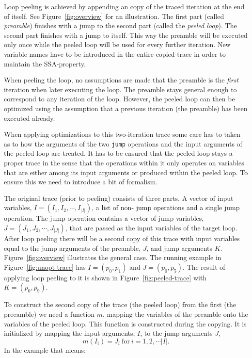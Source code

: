 \documentclass[preprint]{sigplanconf}
\begin{document}
Loop peeling is achieved by appending an copy of the traced iteration at
the end of itself. See Figure~\ref{fig:overview} for an illustration.
The first part (called \emph{preamble}) finishes with a jump to the second part
(called the \emph{peeled loop}). The second part finishes with a jump to itself. This way
the preamble will be executed only once while the peeled loop will
be used for every further iteration. New variable names have to be
introduced in the entire copied trace in order to maintain the SSA-property.

When peeling the loop, no assumptions are made that the preamble is
the \emph{first} iteration when later executing the loop. The preamble stays
general enough to correspond to any iteration of the loop.
However, the peeled loop can then be optimized using the assumption that a
previous iteration (the preamble) has been executed already.


When applying optimizations to this two-iteration trace
some care has to taken as to how the arguments of the two
\lstinline{jump} operations and the input arguments of the peeled loop are
treated. It has to be ensured that the peeled loop stays a proper
trace in the sense that the operations within it only operates on
variables that are either among its input arguments 
or produced within the peeled loop. To ensure this we need
to introduce a bit of formalism.

The original trace (prior to peeling) consists of three parts.
A vector of input
variables, $I=\left(I_1, I_2, \cdots, I_{|I|}\right)$, a list of non-
jump operations and a single
jump operation. The jump operation contains a vector of jump variables,
$J=\left(J_1, J_2, \cdots, J_{|J|}\right)$, that are passed as the input variables of the target loop. After
loop peeling there will be a second copy of this trace with input
variables equal to the jump arguments of the preamble, $J$, and jump
arguments $K$. 
Figure~\ref{fig:overview} illustrates the general case. The running
example in Figure~\ref{fig:unopt-trace} has  $I = \left( p_0, p_1
\right)$ and $J = \left( p_0, p_5 \right)$. The result of applying
loop peeling to it is shown in Figure~\ref{fig:peeled-trace} with 
$K = \left( p_0, p_9 \right)$. 

To construct the second copy of the trace (the peeled loop) from the
first (the preeamble) we need a
function $m$, mapping the variables of the preamble onto the
variables of the peeled loop. This function is constructed during the
copying. It is initialized by mapping the input arguments, $I$, to
the jump arguments $J$,
\begin{equation}
  m\left(I_i\right) = J_i \ \text{for}\ i = 1, 2, \cdots |I| .
\end{equation}
In the example that means:
\end{document}
